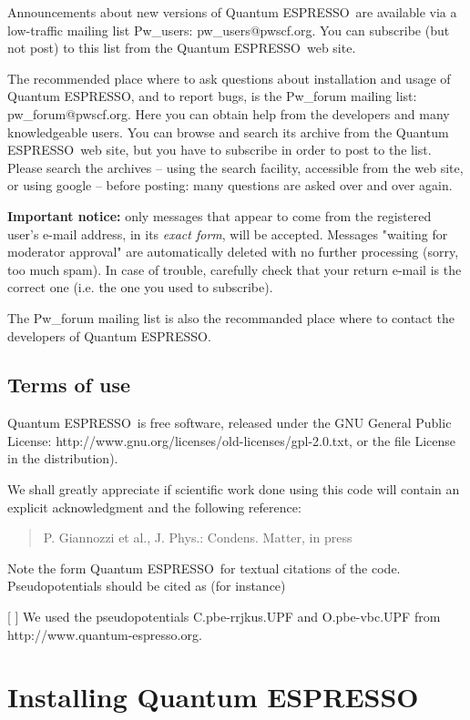 \documentclass[12pt,a4paper]{article}
\def\qe{{\sc Quantum ESPRESSO}}
\begin{document}
Announcements about new versions of \qe\ are available 
via a low-traffic mailing list Pw\_users: pw\_users@pwscf.org. 
You can
subscribe (but not post) to this list from the \qe\ web site.
    
The recommended place where to ask questions about installation 
and usage of \qe, and to report bugs, is the Pw\_forum mailing
list: pw\_forum@pwscf.org. Here you can obtain help from the
developers and many knowledgeable users. You can browse 
and search its archive from the \qe\ web site, but you have to
subscribe in order to post to the list.
Please search the archives -- using the search facility, accessible
from the web site, or using google -- before posting: many 
questions are asked over and over again.

{\bf Important notice:} only messages that appear to come from the 
registered user's e-mail address, in its {\em exact form}, will be
accepted. Messages "waiting for moderator approval" are
automatically deleted with no further processing (sorry, too 
much spam). In case of trouble, carefully check that your return 
e-mail is the correct one 
(i.e. the one you used to subscribe).

The Pw\_forum mailing list is also the recommanded place where to 
contact the developers of \qe.
 
\subsection{Terms of use}

\qe\ is free software, released under the 
GNU General Public License:
http://www.gnu.org/licenses/old-licenses/gpl-2.0.txt, 
or the file License in the distribution).
    
We shall greatly appreciate if scientific work done using this code will 
contain an explicit acknowledgment and the following reference:
\begin{quote}
P. Giannozzi et al., J. Phys.: Condens. Matter, in press
\end{quote}
Note the form \qe\ for textual citations of the code.
Pseudopotentials should be cited as (for instance)

[ ] We used the pseudopotentials C.pbe-rrjkus.UPF
and O.pbe-vbc.UPF from http://www.quantum-espresso.org.

\section{Installing \qe}
\end{document}
